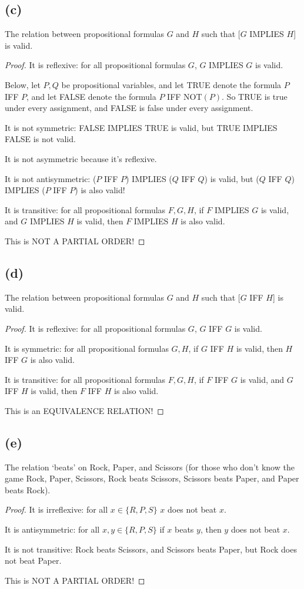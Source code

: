 \documentclass[14pt]{extarticle}
\begin{document}
\subsection{(c)}
The relation between propositional formulas $G$ and $H$ such that [$G$ IMPLIES $H$] is valid.
\begin{proof}
It is reflexive: for all propositional formulas $G$, $G$ IMPLIES $G$ is valid.

Below, let $P, Q$ be propositional variables, and let TRUE denote the formula $P$ IFF $P$, and let FALSE denote the formula $P$ IFF NOT$(P)$. So TRUE is true under every assignment, and FALSE is false under every assignment.

It is not symmetric: FALSE IMPLIES TRUE is valid, but TRUE IMPLIES FALSE is not valid.

It is not asymmetric because it's reflexive.

It is not antisymmetric: ($P$ IFF $P$) IMPLIES ($Q$ IFF $Q$) is valid, but ($Q$ IFF $Q$) IMPLIES ($P$ IFF $P$) is also valid!

It is transitive: for all propositional formulas $F, G, H$, if $F$ IMPLIES $G$ is valid, and $G$ IMPLIES $H$ is valid, then $F$ IMPLIES $H$ is also valid.

This is NOT A PARTIAL ORDER!
\end{proof}

\subsection{(d)}
The relation between propositional formulas $G$ and $H$ such that [$G$ IFF $H$] is valid.
\begin{proof}
It is reflexive: for all propositional formulas $G$, $G$ IFF $G$ is valid.

It is symmetric: for all propositional formulas $G, H$, if $G$ IFF $H$ is valid, then $H$ IFF $G$ is also valid.

It is transitive: for all propositional formulas $F, G, H$, if $F$ IFF $G$ is valid, and $G$ IFF $H$ is valid, then $F$ IFF $H$ is also valid.

This is an EQUIVALENCE RELATION!
\end{proof}

\subsection{(e)}
The relation ‘beats’ on Rock, Paper, and Scissors (for those who don’t know the game Rock, Paper, Scissors, Rock beats Scissors, Scissors beats Paper, and Paper beats Rock).
\begin{proof}
It is irreflexive: for all $x \in \{R, P, S\}$ $x$ does not beat $x$.

It is antisymmetric: for all $x, y \in \{R, P, S\}$ if $x$ beats $y$, then $y$ does not beat $x$.

It is not transitive: Rock beats Scissors, and Scissors beats Paper, but Rock does not beat Paper.

This is NOT A PARTIAL ORDER!
\end{proof}
\end{document}
